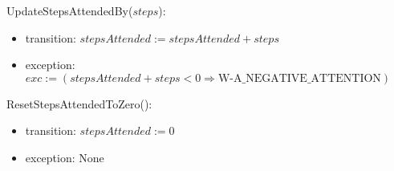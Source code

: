 \noindent UpdateStepsAttendedBy($\mathit{steps}$):
\begin{itemize}

    \item transition: $\mathit{stepsAttended} := \mathit{stepsAttended} +
    \mathit{steps} $

    \item exception: $exc := ( \mathit{stepsAttended} + \mathit{steps} < 0
    \Rightarrow \text{W-A\_NEGATIVE\_ATTENTION} )$

\end{itemize}

\noindent ResetStepsAttendedToZero():
\begin{itemize}

    \item transition: $\mathit{stepsAttended} := 0 $

    \item exception: None

\end{itemize}